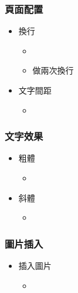 \documentclass[mathserif]{beamer}
\begin{document}
\begin{frame}
    \frametitle{頁面配置}
    \begin{itemize}
        \item 換行
            \begin{itemize}
                \item {\color{red}{\textbackslash\textbackslash}}
                \item 做兩次換行
            \end{itemize}
        \item 文字間距
            \begin{itemize}
                \item {}
            \end{itemize}
    \end{itemize}
\end{frame}

\begin{frame}
    \frametitle{文字效果}
    \begin{itemize}
        \item 粗體
            \begin{itemize}
                \item {}
            \end{itemize}
        \item 斜體
            \begin{itemize}
                \item {}
            \end{itemize}
    \end{itemize}
\end{frame}

\begin{frame}
    \frametitle{圖片插入}
    \begin{itemize}
        \item 插入圖片
            \begin{itemize}
                \item {}
            \end{itemize}
    \end{itemize}
\end{frame}
\end{document}
